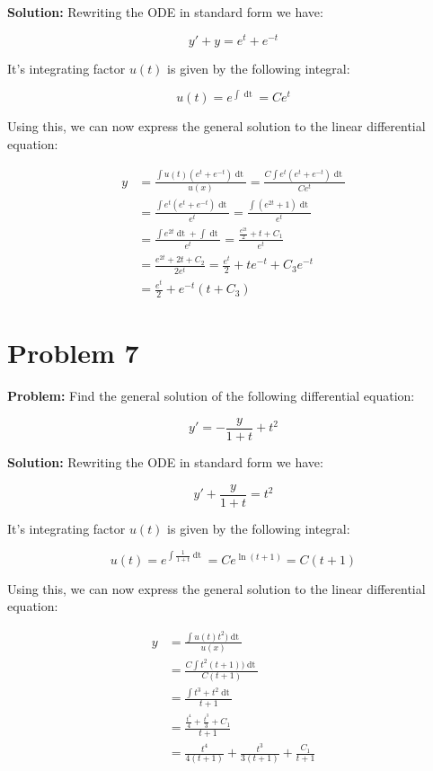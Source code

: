 \documentclass{article}
\begin{document}
\noindent\textbf{Solution:} Rewriting the ODE in standard form we have:

\begin{equation*}
    y'+y=e^t+e^{-t}
\end{equation*}

It's integrating factor $u(t)$ is given by the following integral:

\begin{equation*}
    u(t)=e^{\int\mathop{dt}}=Ce^t
\end{equation*}

Using this, we can now express the general solution to the linear differential equation:

\begin{align*}
    y&=\frac{\int u(t)(e^t+e^{-t})\mathop{dt}}{u(x)}=\frac{C\int e^t(e^t+e^{-t})\mathop{dt}}{Ce^t}\\
    &=\frac{\int e^t(e^t+e^{-t})\mathop{dt}}{e^t}=\frac{\int (e^{2t}+1)\mathop{dt}}{e^t}\\
    &=\frac{\int e^{2t}\mathop{dt}+\int\mathop{dt}}{e^t}=\frac{\frac{e^{2t}}{2}+t+C_1}{e^t}\\
    &=\frac{e^{2t}+2t+C_2}{2e^t}=\frac{e^{t}}{2}+te^{-t}+C_3e^{-t}\\
    &=\frac{e^{t}}{2}+e^{-t}(t+C_3)
\end{align*}

\section*{Problem 7}
\noindent\textbf{Problem:} Find the general solution of the following differential equation:

\begin{equation*}
    y'=-\frac{y}{1+t}+t^2
\end{equation*}

\noindent\textbf{Solution:} Rewriting the ODE in standard form we have:

\begin{equation*}
    y'+\frac{y}{1+t}=t^2
\end{equation*}

It's integrating factor $u(t)$ is given by the following integral:

\begin{equation*}
    u(t)=e^{\int\frac{1}{1+t}\mathop{dt}}=Ce^{\ln(t+1)}=C(t+1)
\end{equation*}

Using this, we can now express the general solution to the linear differential equation:

\begin{align*}
    y&=\frac{\int u(t)t^2)\mathop{dt}}{u(x)}\\
    &=\frac{C\int t^2(t+1))\mathop{dt}}{C(t+1)}\\
    &=\frac{\int t^3+t^2\mathop{dt}}{t+1}\\
    &=\frac{\frac{t^4}{4}+\frac{t^3}{3}+C_1}{t+1}\\
    &=\frac{t^4}{4(t+1)}+\frac{t^3}{3(t+1)}+\frac{C_1}{t+1}
\end{align*}
\end{document}
